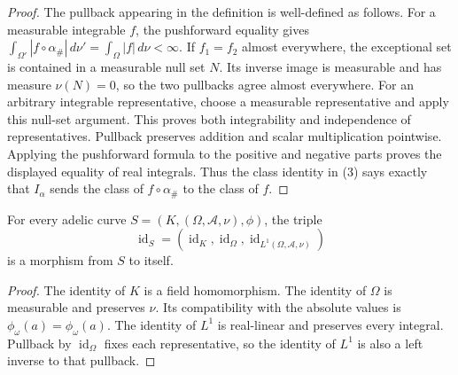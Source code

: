 \begin{proof}
The pullback appearing in the definition is well-defined as follows.
For a measurable integrable $f$, the pushforward equality gives
$\int_{\Omega'}|f\circ\alpha_\#|\,d\nu'
=\int_\Omega|f|\,d\nu<\infty$.
If $f_1=f_2$ almost everywhere, the exceptional set is contained in a
measurable null set $N$. Its inverse image is measurable and has measure
$\nu(N)=0$, so the two pullbacks agree almost everywhere.
For an arbitrary integrable representative, choose a measurable
representative and apply this null-set argument. This proves both
integrability and independence of representatives. Pullback preserves
addition and scalar multiplication pointwise. Applying the pushforward
formula to the positive and negative parts proves the displayed equality
of real integrals. Thus the class identity in (3) says exactly that
$I_\alpha$ sends the class of $f\circ\alpha_\#$ to the class of $f$.
\end{proof}

\begin{lemma}
\label{lem:adelic-morphism-id}
\leanok
{}
For every adelic curve $S=(K,(\Omega,\mathcal A,\nu),\phi)$,
the triple
\[
 \operatorname{id}_S=
 (\operatorname{id}_K,\operatorname{id}_\Omega,
  \operatorname{id}_{L^1(\Omega,\mathcal A,\nu)})
\]
is a morphism from $S$ to itself.
\end{lemma}
\begin{proof}
The identity of $K$ is a field homomorphism. The identity of $\Omega$
is measurable and preserves $\nu$. Its compatibility with the absolute
values is $\phi_\omega(a)=\phi_\omega(a)$.
The identity of $L^1$ is real-linear and preserves every integral.
Pullback by $\operatorname{id}_\Omega$ fixes each representative, so
the identity of $L^1$ is also a left inverse to that pullback.
\end{proof}

